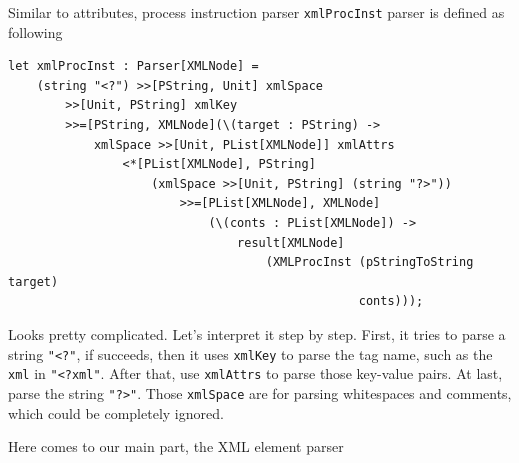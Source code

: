 Similar to attributes, process instruction parser \texttt{xmlProcInst} parser is defined as following

\begin{lstlisting}
let xmlProcInst : Parser[XMLNode] =
    (string "<?") >>[PString, Unit] xmlSpace
        >>[Unit, PString] xmlKey
        >>=[PString, XMLNode](\(target : PString) ->
            xmlSpace >>[Unit, PList[XMLNode]] xmlAttrs
                <*[PList[XMLNode], PString]
                    (xmlSpace >>[Unit, PString] (string "?>"))
                        >>=[PList[XMLNode], XMLNode]
                            (\(conts : PList[XMLNode]) ->
                                result[XMLNode]
                                    (XMLProcInst (pStringToString target)
                                                 conts)));
\end{lstlisting}

Looks pretty complicated. Let's interpret it step by step. First, it tries to parse a string \texttt{"\textless?"}, if succeeds, then it uses \texttt{xmlKey} to parse the tag name, such as the \texttt{xml} in \texttt{"\textless?xml"}. After that, use \texttt{xmlAttrs} to parse those key-value pairs. At last, parse the string \texttt{"?\textgreater"}. Those \texttt{xmlSpace} are for parsing whitespaces and comments, which could be completely ignored.

Here comes to our main part, the XML element parser

